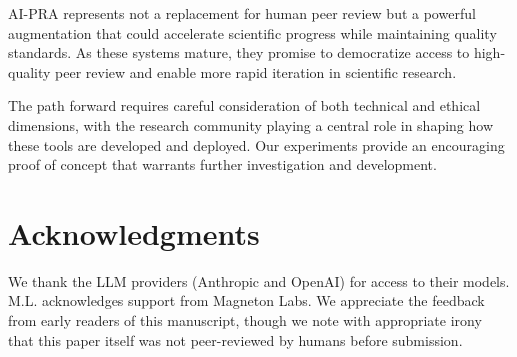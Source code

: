 \documentclass[11pt,a4paper]{article}
\begin{document}
AI-PRA represents not a replacement for human peer review but a powerful augmentation that could accelerate scientific progress while maintaining quality standards. As these systems mature, they promise to democratize access to high-quality peer review and enable more rapid iteration in scientific research.

The path forward requires careful consideration of both technical and ethical dimensions, with the research community playing a central role in shaping how these tools are developed and deployed. Our experiments provide an encouraging proof of concept that warrants further investigation and development.

\section*{Acknowledgments}

We thank the LLM providers (Anthropic and OpenAI) for access to their models. M.L. acknowledges support from Magneton Labs. We appreciate the feedback from early readers of this manuscript, though we note with appropriate irony that this paper itself was not peer-reviewed by humans before submission.
\end{document}
